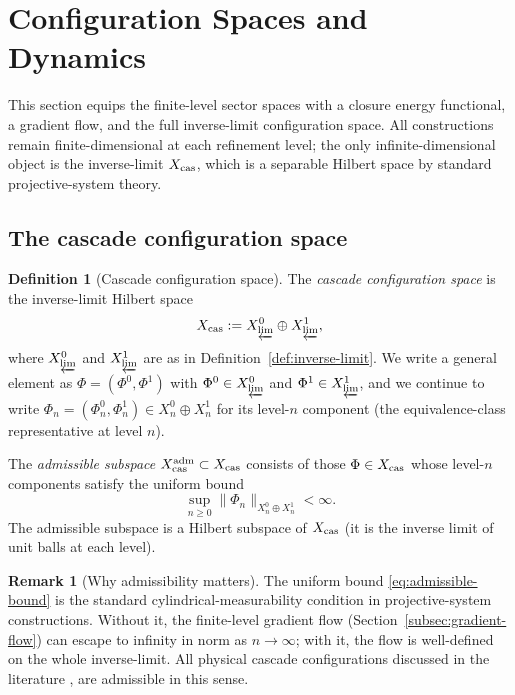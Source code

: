 \documentclass[11pt, a4paper]{amsart}
\theoremstyle{definition}
\newtheorem{definition}[theorem]{Definition}
\newtheorem{remark}[theorem]{Remark}
\newcommand{\cas}{{\rm cas}}
\begin{document}
\section{Configuration Spaces and Dynamics}
\label{sec:dynamics}

This section equips the finite-level sector spaces with a closure
energy functional, a gradient flow, and the full inverse-limit
configuration space. All constructions remain finite-dimensional at
each refinement level; the only infinite-dimensional object is the
inverse-limit $X_\cas$, which is a separable Hilbert space by
standard projective-system theory.

\subsection{The cascade configuration space}
\label{subsec:config-space}

\begin{definition}[Cascade configuration space]
\label{def:xcas}
The \emph{cascade configuration space} is the inverse-limit Hilbert
space
\[
  X_\cas := X^0_{\varprojlim} \oplus X^1_{\varprojlim},
\]
where $X^0_{\varprojlim}$ and $X^1_{\varprojlim}$ are as in
Definition~\ref{def:inverse-limit}. We write a general element as
$\Phi = (\Phi^0, \Phi^1)$ with $\Phi^0 \in X^0_{\varprojlim}$ and
$\Phi^1 \in X^1_{\varprojlim}$, and we continue to write
$\Phi_n = (\Phi_n^0, \Phi_n^1) \in X_n^0 \oplus X_n^1$ for its
level-$n$ component (the equivalence-class representative at
level $n$).

The \emph{admissible subspace} $X_\cas^{\rm adm} \subset X_\cas$
consists of those $\Phi \in X_\cas$ whose level-$n$ components
satisfy the uniform bound
\begin{equation}
\label{eq:admissible-bound}
  \sup_{n \geq 0} \|\Phi_n\|_{X_n^0 \oplus X_n^1} < \infty.
\end{equation}
The admissible subspace is a Hilbert subspace of $X_\cas$ (it is the
inverse limit of unit balls at each level).
\end{definition}

\begin{remark}[Why admissibility matters]
The uniform bound \eqref{eq:admissible-bound} is the standard
cylindrical-measurability condition in projective-system
constructions. Without it, the finite-level gradient flow
(Section~\ref{subsec:gradient-flow}) can escape to infinity in
norm as $n \to \infty$; with it, the flow is well-defined on the
whole inverse-limit. All physical cascade configurations discussed
in the literature \cite[\S 4]{CascadeEmbeddings},
\cite[\S\S D1--D4]{CascadeDynamics} are admissible in this sense.
\end{remark}
\end{document}
